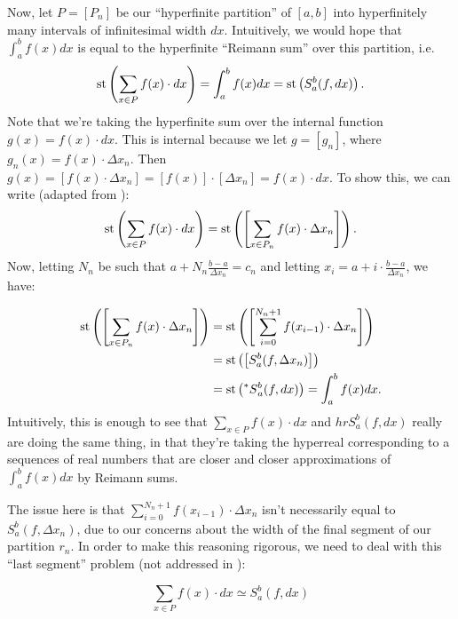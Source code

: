 Now, let $P = [P_n]$ be our ``hyperfinite partition'' of $[a,b]$ into hyperfinitely many intervals of infinitesimal width $dx$. Intuitively, we would hope that $\int_a^b f(x)dx$ is equal to the hyperfinite ``Reimann sum'' over this partition, i.e.
\[
\operatorname{st}\left(\sum_{x \in P} f(x) \cdot dx\right) = \int_a^b f(x)dx = \operatorname{st}\left(S_a^b(f, dx)\right).
\]
Note that we're taking the hyperfinite sum over the internal function $g(x) = f(x) \cdot dx$. This is internal because we let $g = [g_n]$, where $g_n(x) = f(x) \cdot \Delta x_n$. Then $g(x) = [f(x) \cdot \Delta x_n] = [f(x)] \cdot [\Delta x_n] = f(x) \cdot dx$. To show this, we can write (adapted from \cite[Chapter~12.7]{goldblatt1998}):
\[
\operatorname{st}\left(\sum_{x \in P} f(x) \cdot dx \right)= \operatorname{st}\left(\left[\sum_{x \in P_n} f(x) \cdot \Delta x_n\right]\right) .
\]
Now, letting $N_n$ be such that $a + N_n \frac{b-a}{\Delta x_n} = c_n$ and letting $x_i = a + i \cdot \frac{b-a}{\Delta x_n}$, we have:

\begin{align*}
\operatorname{st}\left(\left[\sum_{x \in P_n} f(x) \cdot \Delta x_n\right]\right) &= \operatorname{st}\left(\left[\sum_{i=0}^{N_n+1} f(x_{i-1}) \cdot \Delta x_n\right]\right) \\
    &= \operatorname{st}\left(\left[ S_a^b(f, \Delta x_n) \right]\right) \\
    &= \operatorname{st}\left(\prescript{*}{}{S}_a^b(f, dx)\right) = \int_a^b f(x)dx.
\end{align*}
Intuitively, this is enough to see that $\sum_{x \in P} f(x) \cdot dx$ and $hr{S}_a^b(f, dx)$ really are doing the same thing, in that they're taking the hyperreal corresponding to a sequences of real numbers that are closer and closer approximations of $\int_a^b f(x)dx$ by Reimann sums. 

The issue here is that $\sum_{i=0}^{N_n+1} f(x_{i-1}) \cdot \Delta x_n$ isn't necessarily equal to $S_a^b(f, \Delta x_n)$, due to our concerns about the width of the final segment of our partition $r_n$. In order to make this reasoning rigorous, we need to deal with this ``last segment'' problem (not addressed in \cite{goldblatt1998}):

\begin{lemma}
    \[ \sum_{x \in P} f(x) \cdot dx \simeq S_a^b(f, dx) \]
\end{lemma}

